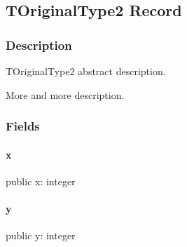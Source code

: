 \documentclass{report}
\begin{document}
\subsection*{TOriginalType2 Record}
\subsubsection*{\large{\textbf{Description}}\normalsize\hspace{1ex}\hfill}
TOriginalType2 abstract description.\hfill\vspace*{1ex}

 More and more description.\subsubsection*{\large{\textbf{Fields}}\normalsize\hspace{1ex}\hfill}
\paragraph*{x}\hspace*{\fill}

\begin{list}{}{
\setlength{\itemindent}{0cm}
\setlength{\listparindent}{0cm}
\setlength{\leftmargin}{\evensidemargin}
\addtolength{\leftmargin}{\tmplength}
\settowidth{\labelsep}{X}
\addtolength{\leftmargin}{\labelsep}
\setlength{\labelwidth}{\tmplength}
}
\begin{flushleft}
\item[\textbf{Declaration}\hfill]
\begin{ttfamily}
public x: integer \end{ttfamily}


\end{flushleft}
\end{list}
\paragraph*{y}\hspace*{\fill}

\begin{list}{}{
\setlength{\itemindent}{0cm}
\setlength{\listparindent}{0cm}
\setlength{\leftmargin}{\evensidemargin}
\addtolength{\leftmargin}{\tmplength}
\settowidth{\labelsep}{X}
\addtolength{\leftmargin}{\labelsep}
\setlength{\labelwidth}{\tmplength}
}
\begin{flushleft}
\item[\textbf{Declaration}\hfill]
\begin{ttfamily}
public y: integer \end{ttfamily}


\end{flushleft}
\end{list}
\end{document}
